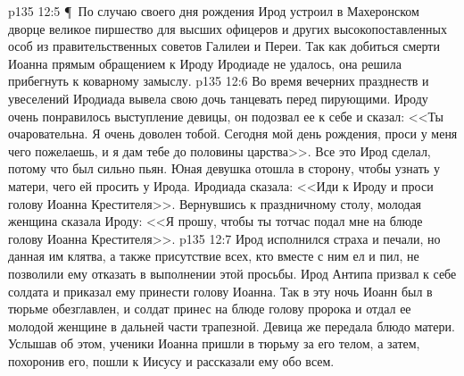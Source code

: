 \vs p135 12:5 \P\ По случаю своего дня рождения Ирод устроил в Махеронском дворце великое пиршество для высших офицеров и других высокопоставленных особ из правительственных советов Галилеи и Переи. Так как добиться смерти Иоанна прямым обращением к Ироду Иродиаде не удалось, она решила прибегнуть к коварному замыслу.
\vs p135 12:6 Во время вечерних празднеств и увеселений Иродиада вывела свою дочь танцевать перед пирующими. Ироду очень понравилось выступление девицы, он подозвал ее к себе и сказал: <<Ты очаровательна. Я очень доволен тобой. Сегодня мой день рождения, проси у меня чего пожелаешь, и я дам тебе до половины царства>>. Все это Ирод сделал, потому что был сильно пьян. Юная девушка отошла в сторону, чтобы узнать у матери, чего ей просить у Ирода. Иродиада сказала: <<Иди к Ироду и проси голову Иоанна Крестителя>>. Вернувшись к праздничному столу, молодая женщина сказала Ироду: <<Я прошу, чтобы ты тотчас подал мне на блюде голову Иоанна Крестителя>>.
\vs p135 12:7 Ирод исполнился страха и печали, но данная им клятва, а также присутствие всех, кто вместе с ним ел и пил, не позволили ему отказать в выполнении этой просьбы. Ирод Антипа призвал к себе солдата и приказал ему принести голову Иоанна. Так в эту ночь Иоанн был в тюрьме обезглавлен, и солдат принес на блюде голову пророка и отдал ее молодой женщине в дальней части трапезной. Девица же передала блюдо матери. Услышав об этом, ученики Иоанна пришли в тюрьму за его телом, а затем, похоронив его, пошли к Иисусу и рассказали ему обо всем.
